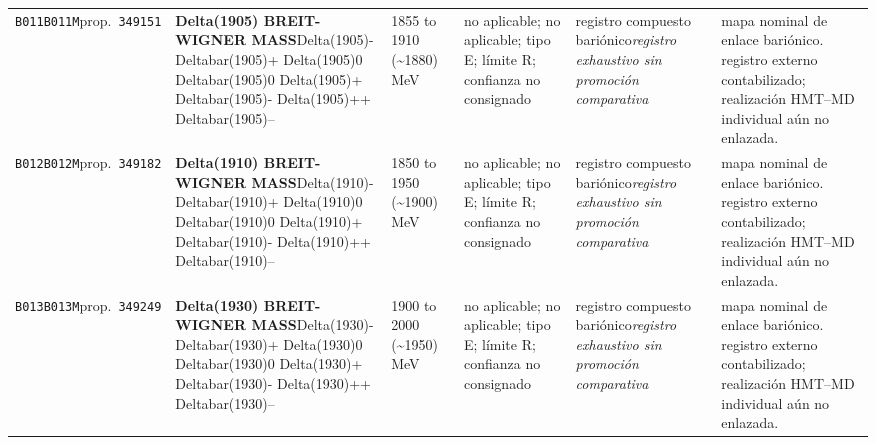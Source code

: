 \begin{landscape}
\begin{longtable}{L{1.85cm}L{4.45cm}L{2.35cm}L{4.05cm}L{3.35cm}L{7.15cm}}
\texttt{B011}\newline \texttt{B011M}\newline prop.\ \texttt{349151} & \textbf{Delta(1905) BREIT-WIGNER MASS}\newline Delta(1905)- \textbar{}\allowbreak{} Deltabar(1905)+ \textbar{}\allowbreak{} Delta(1905)0 \textbar{}\allowbreak{} Deltabar(1905)0 \textbar{}\allowbreak{} Delta(1905)+ \textbar{}\allowbreak{} Deltabar(1905)- \textbar{}\allowbreak{} Delta(1905)++ \textbar{}\allowbreak{} Deltabar(1905)-- & 1855 to 1910 (\textasciitilde{}1880)\,MeV & no aplicable; no aplicable; tipo E; límite R; confianza no consignado & registro compuesto bariónico\newline \emph{registro exhaustivo sin promoción comparativa} & mapa nominal de enlace bariónico. registro externo contabilizado; realización HMT--MD individual aún no enlazada. \\
\texttt{B012}\newline \texttt{B012M}\newline prop.\ \texttt{349182} & \textbf{Delta(1910) BREIT-WIGNER MASS}\newline Delta(1910)- \textbar{}\allowbreak{} Deltabar(1910)+ \textbar{}\allowbreak{} Delta(1910)0 \textbar{}\allowbreak{} Deltabar(1910)0 \textbar{}\allowbreak{} Delta(1910)+ \textbar{}\allowbreak{} Deltabar(1910)- \textbar{}\allowbreak{} Delta(1910)++ \textbar{}\allowbreak{} Deltabar(1910)-- & 1850 to 1950 (\textasciitilde{}1900)\,MeV & no aplicable; no aplicable; tipo E; límite R; confianza no consignado & registro compuesto bariónico\newline \emph{registro exhaustivo sin promoción comparativa} & mapa nominal de enlace bariónico. registro externo contabilizado; realización HMT--MD individual aún no enlazada. \\
\texttt{B013}\newline \texttt{B013M}\newline prop.\ \texttt{349249} & \textbf{Delta(1930) BREIT-WIGNER MASS}\newline Delta(1930)- \textbar{}\allowbreak{} Deltabar(1930)+ \textbar{}\allowbreak{} Delta(1930)0 \textbar{}\allowbreak{} Deltabar(1930)0 \textbar{}\allowbreak{} Delta(1930)+ \textbar{}\allowbreak{} Deltabar(1930)- \textbar{}\allowbreak{} Delta(1930)++ \textbar{}\allowbreak{} Deltabar(1930)-- & 1900 to 2000 (\textasciitilde{}1950)\,MeV & no aplicable; no aplicable; tipo E; límite R; confianza no consignado & registro compuesto bariónico\newline \emph{registro exhaustivo sin promoción comparativa} & mapa nominal de enlace bariónico. registro externo contabilizado; realización HMT--MD individual aún no enlazada. \\

\end{longtable}
\end{landscape}
